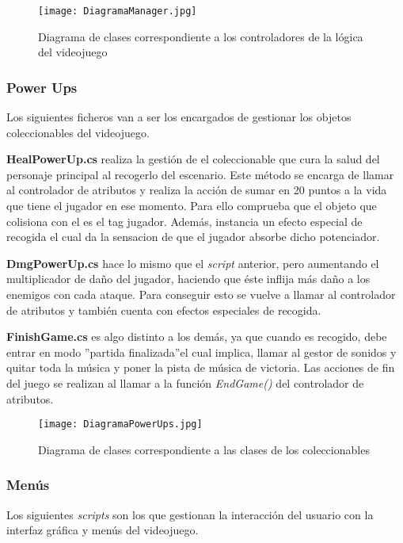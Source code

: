\begin{figure}[H]
    \centering
    \texttt{[image: DiagramaManager.jpg]}
    \caption{Diagrama de clases correspondiente a los controladores de la lógica del videojuego}
\end{figure}

\subsubsection{Power Ups}

Los siguientes ficheros van a ser los encargados de gestionar los objetos coleccionables del videojuego.

\textbf{HealPowerUp.cs} realiza la gestión de el coleccionable que cura la salud del personaje principal al recogerlo del escenario. Este método se encarga de llamar al controlador de atributos y realiza la acción de sumar en 20 puntos a la vida que tiene el jugador en ese momento. Para ello comprueba que el objeto que colisiona con el es el tag jugador. Además, instancia un efecto especial de recogida el cual da la sensacion de que el jugador absorbe dicho potenciador.

\textbf{DmgPowerUp.cs} hace lo mismo que el \textit{script} anterior, pero aumentando el multiplicador de daño del jugador, haciendo que éste inflija más daño a los enemigos con cada ataque. Para conseguir esto se vuelve a llamar al controlador de atributos y también cuenta con efectos especiales de recogida.

\textbf{FinishGame.cs} es algo distinto a los demás, ya que cuando es recogido, debe entrar en modo ''partida finalizada''el cual implica, llamar al gestor de sonidos y quitar toda la música y poner la pista de música de victoria. Las acciones de fin del juego se realizan al llamar a la función \textit{EndGame()} del controlador de atributos. 

\begin{figure}[H]
    \centering
    \texttt{[image: DiagramaPowerUps.jpg]}
    \caption{Diagrama de clases correspondiente a las clases de los coleccionables}
\end{figure}

\subsubsection{Menús}

Los siguientes \textit{scripts} son los que gestionan la interacción del usuario con la interfaz gráfica y menús del videojuego.

